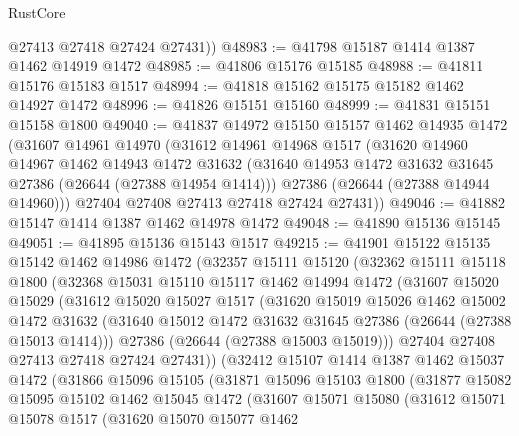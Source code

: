 \begin{lexlean}{RustCore}
\begin{coremodule}
        @27413
        @27418
        @27424
        @27431))
@48983 := @41798 @15187 @1414 @1387 @1462 @14919 @1472
@48985 := @41806 @15176 @15185
@48988 := @41811 @15176 @15183 @1517
@48994 := @41818 @15162 @15175 @15182 @1462 @14927 @1472
@48996 := @41826 @15151 @15160
@48999 := @41831 @15151 @15158 @1800
@49040 := @41837
    @14972
    @15150
    @15157
    @1462
    @14935
    @1472
    (@31607
      @14961
      @14970
      (@31612
        @14961
        @14968
        @1517
        (@31620
          @14960
          @14967
          @1462
          @14943
          @1472
          @31632
          (@31640 @14953 @1472 @31632 @31645 @27386 (@26644 (@27388 @14954 @1414)))
          @27386
          (@26644 (@27388 @14944 @14960)))
        @27404
        @27408
        @27413
        @27418
        @27424
        @27431))
@49046 := @41882 @15147 @1414 @1387 @1462 @14978 @1472
@49048 := @41890 @15136 @15145
@49051 := @41895 @15136 @15143 @1517
@49215 := @41901
    @15122
    @15135
    @15142
    @1462
    @14986
    @1472
    (@32357
      @15111
      @15120
      (@32362
        @15111
        @15118
        @1800
        (@32368
          @15031
          @15110
          @15117
          @1462
          @14994
          @1472
          (@31607
            @15020
            @15029
            (@31612
              @15020
              @15027
              @1517
              (@31620
                @15019
                @15026
                @1462
                @15002
                @1472
                @31632
                (@31640 @15012 @1472 @31632 @31645 @27386 (@26644 (@27388 @15013 @1414)))
                @27386
                (@26644 (@27388 @15003 @15019)))
              @27404
              @27408
              @27413
              @27418
              @27424
              @27431))
          (@32412
            @15107
            @1414
            @1387
            @1462
            @15037
            @1472
            (@31866
              @15096
              @15105
              (@31871
                @15096
                @15103
                @1800
                (@31877
                  @15082
                  @15095
                  @15102
                  @1462
                  @15045
                  @1472
                  (@31607
                    @15071
                    @15080
                    (@31612
                      @15071
                      @15078
                      @1517
                      (@31620
                        @15070
                        @15077
                        @1462

\end{coremodule}
\end{lexlean}
